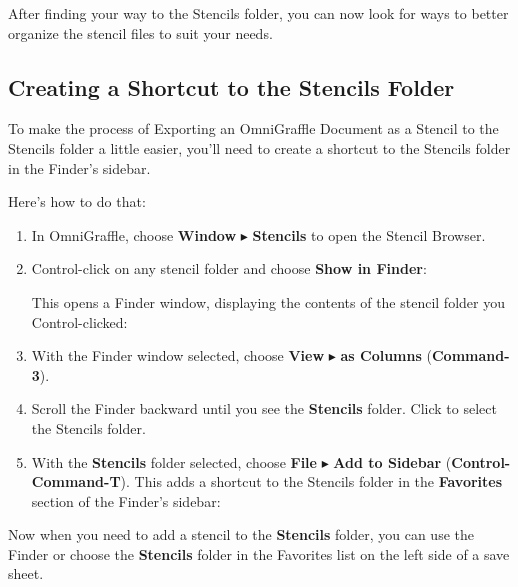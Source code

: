 \documentclass[../main.tex]{subfiles}
\begin{document}
After finding your way to the Stencils folder, you can now look for ways to better organize the
stencil files to suit your needs.

\subsection{Creating a Shortcut to the Stencils Folder}

To make the process of Exporting an OmniGraffle Document as a Stencil to the Stencils folder a
little easier, you'll need to create a shortcut to the Stencils folder in the Finder's
sidebar.

Here's how to do that:

\begin{enumerate}
  \item In OmniGraffle, choose \textbf{Window} $\blacktriangleright$ \textbf{Stencils} to open
    the Stencil Browser.
  \item Control-click on any stencil folder and choose \textbf{Show in Finder}:


    This opens a Finder window, displaying the contents of the stencil folder you Control-clicked:

  \item With the Finder window selected, choose \textbf{View} $\blacktriangleright$ \textbf{as
    Columns} (\textbf{Command-3}).
  \item Scroll the Finder backward until you see the \textbf{Stencils} folder. Click to select
    the Stencils folder.

  \item With the \textbf{Stencils} folder selected, choose \textbf{File} $\blacktriangleright$
    \textbf{Add to Sidebar} (\textbf{Control-Command-T}). This adds a shortcut to the Stencils
    folder in the \textbf{Favorites} section of the Finder's sidebar:

\end{enumerate}

Now when you need to add a stencil to the \textbf{Stencils} folder, you can use the Finder or
choose the \textbf{Stencils} folder in the Favorites list on the left side of a save sheet.

\end{document}
